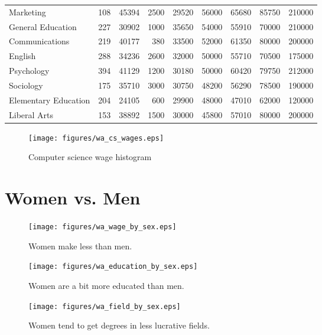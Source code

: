 \documentclass{exam}
\begin{document}
\begin{table}[ht]
\begin{tabular}{lrrrrrrrr}
      Marketing                    & 108   & 45394   & 2500 & 29520   & 56000  & 65680  & 85750   & 210000 \\
      General Education            & 227   & 30902   & 1000 & 35650   & 54000  & 55910  & 70000   & 210000 \\
      Communications               & 219   & 40177   & 380  & 33500   & 52000  & 61350  & 80000   & 200000 \\
      English                      & 288   & 34236   & 2600 & 32000   & 50000  & 55710  & 70500   & 175000 \\
      Psychology                   & 394   & 41129   & 1200 & 30180   & 50000  & 60420  & 79750   & 212000 \\
      Sociology                    & 175   & 35710   & 3000 & 30750   & 48200  & 56290  & 78500   & 190000 \\
      Elementary Education         & 204   & 24105   & 600  & 29900   & 48000  & 47010  & 62000   & 120000 \\
      Liberal Arts                 & 153   & 38892   & 1500 & 30000   & 45800  & 57010  & 80000   & 200000 \\
      \bottomrule
    \end{tabular}
  \end{table}

  \begin{figure}[H]
    \centering
    \texttt{[image: figures/wa\_cs\_wages.eps]}
    \caption{Computer science wage histogram}
  \end{figure}

  \section{Women vs. Men}

  \begin{figure}[H]
    \centering
    \texttt{[image: figures/wa\_wage\_by\_sex.eps]}
    \caption{Women make less than men.}
  \end{figure}
  
  \begin{figure}[H]
    \centering
    \texttt{[image: figures/wa\_education\_by\_sex.eps]}
    \caption{Women are a bit more educated than men.}
  \end{figure}

  \begin{figure}[H]
    \centering
    \texttt{[image: figures/wa\_field\_by\_sex.eps]}
    \caption{ Women tend to get degrees in less lucrative fields.}
  \end{figure}
\end{document}
